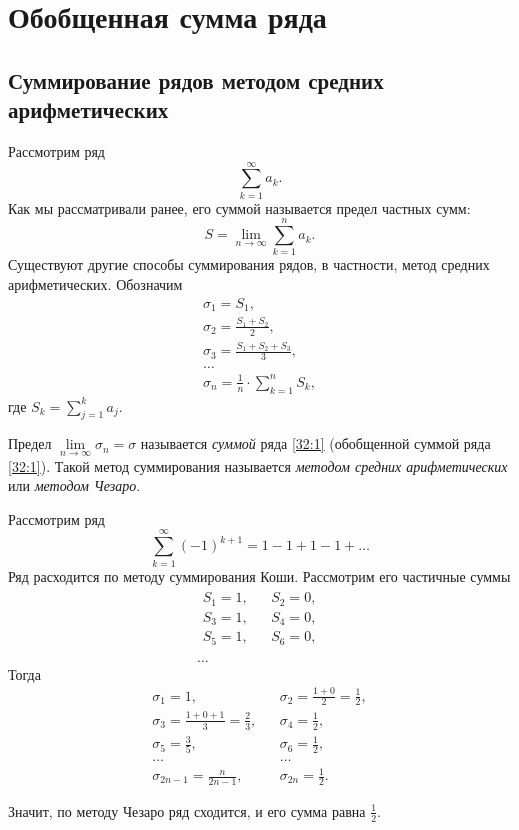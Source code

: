 \documentclass[../../main.tex]{subfiles}
\begin{document}
\section{Обобщенная сумма ряда}

\subsection{Суммирование рядов методом средних арифметических}

Рассмотрим ряд
\begin{equation}
 \sum\limits_{k=1}^\infty a_k.
 \label{32:1}
\end{equation}
Как мы рассматривали ранее, его суммой называется предел частных сумм: \[S = 
\lim\limits_{n\to\infty} \sum\limits_{k=1}^n a_k.\] Существуют другие способы 
суммирования рядов, в частности, метод средних арифметических. 
Обозначим 
\begin{gather*}
 \sigma_1 = S_1, \\
 \sigma_2 = \frac{S_1 + S_2}2, \\
 \sigma_3 = \frac{S_1 + S_2 + S_3}3, \\
 \dots\\
 \sigma_n = \frac1n\cdot\sum\limits_{k=1}^n S_k,
\end{gather*}
где $S_k = \sum\limits_{j=1}^k a_j$.

Предел $\lim\limits_{n\to\infty} \sigma_n = \sigma$ называется \emph{суммой} 
ряда \eqref{32:1} (обобщенной суммой ряда \eqref{32:1}). Такой метод 
суммирования называется \emph{методом средних арифметических} или 
\emph{методом Чезаро}.

\begin{exmp}
 Рассмотрим ряд
 \[\sum\limits_{k=1}^\infty (-1)^{k+1} = 1-1+1-1+\dots\]
 Ряд расходится по методу суммирования Коши. Рассмотрим его частичные суммы
 \begin{gather*}
  \begin{array}{lll}
   S_1 = 1,&& S_2 = 0, \\
   S_3 = 1,&& S_4 = 0, \\
   S_5 = 1,&& S_6 = 0, \\
  \end{array} \\
  \dots
 \end{gather*}
Тогда
\[
 \begin{array}{lll}
 \sigma_1 = 1,&&
 \sigma_2 = \frac{1+0}2 = \frac12, \\
 \sigma_3 = \frac{1+0+1}3 = \frac23,&&
 \sigma_4 = \frac12, \\
 \sigma_5 = \frac35,&&
 \sigma_6 = \frac12, \\
 \dots&& \dots \\
 \sigma_{2n-1} = \frac{n}{2n-1},&& \sigma_{2n}=\frac12.
 \end{array}
\]

Значит, по методу Чезаро ряд сходится, и его сумма равна $\frac12$.
\end{exmp}
\end{document}
